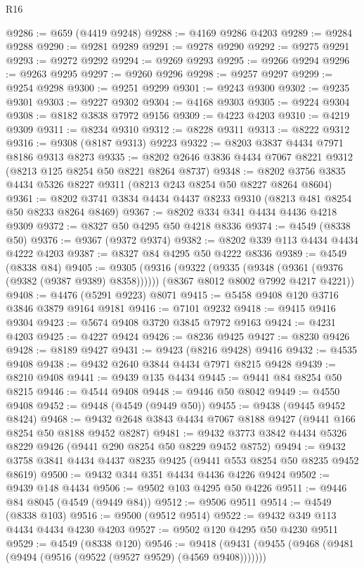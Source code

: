 \begin{lexlean}{R16}
\begin{coremodule}
@9286 := @659 (@4419 @9248)
@9288 := @4169 @9286 @4203
@9289 := @9284 @9288
@9290 := @9281 @9289
@9291 := @9278 @9290
@9292 := @9275 @9291
@9293 := @9272 @9292
@9294 := @9269 @9293
@9295 := @9266 @9294
@9296 := @9263 @9295
@9297 := @9260 @9296
@9298 := @9257 @9297
@9299 := @9254 @9298
@9300 := @9251 @9299
@9301 := @9243 @9300
@9302 := @9235 @9301
@9303 := @9227 @9302
@9304 := @4168 @9303
@9305 := @9224 @9304
@9308 := @8182 @3838 @7972 @9156
@9309 := @4223 @4203
@9310 := @4219 @9309
@9311 := @8234 @9310
@9312 := @8228 @9311
@9313 := @8222 @9312
@9316 := @9308 (@8187 @9313) @9223
@9322 := @8203 @3837 @4434 @7971 @8186 @9313 @8273
@9335 := @8202 @2646 @3836 @4434 @7067 @8221 @9312 (@8213 @125 @8254 @50 @8221 @8264 @8737)
@9348 := @8202 @3756 @3835 @4434 @5326 @8227 @9311 (@8213 @243 @8254 @50 @8227 @8264 @8604)
@9361 := @8202 @3741 @3834 @4434 @4437 @8233 @9310 (@8213 @481 @8254 @50 @8233 @8264 @8469)
@9367 := @8202 @334 @341 @4434 @4436 @4218 @9309
@9372 := @8327 @50 @4295 @50 @4218 @8336
@9374 := @4549 (@8338 @50)
@9376 := @9367 (@9372 @9374)
@9382 := @8202 @339 @113 @4434 @4434 @4222 @4203
@9387 := @8327 @84 @4295 @50 @4222 @8336
@9389 := @4549 (@8338 @84)
@9405 := @9305
    (@9316
      (@9322 (@9335 (@9348 (@9361 (@9376 (@9382 (@9387 @9389) @8358))))))
      (@8367 @8012 @8002 @7992 @4217 @4221))
@9408 := @4476 (@5291 @9223) @8071
@9415 := @5458 @9408 @120 @3716 @3846 @3879 @9164 @9181
@9416 := @7101 @9232
@9418 := @9415 @9416 @9304
@9423 := @5674 @9408 @3720 @3845 @7972 @9163
@9424 := @4231 @4203
@9425 := @4227 @9424
@9426 := @8236 @9425
@9427 := @8230 @9426
@9428 := @8189 @9427
@9431 := @9423 (@8216 @9428) @9416
@9432 := @4535 @9408
@9438 := @9432 @2640 @3844 @4434 @7971 @8215 @9428
@9439 := @8210 @9408
@9441 := @9439 @135 @4434
@9445 := @9441 @84 @8254 @50 @8215
@9446 := @4544 @9408
@9448 := @9446 @50 @8042
@9449 := @4550 @9408
@9452 := @9448 (@4549 (@9449 @50))
@9455 := @9438 (@9445 @9452 @8424)
@9468 := @9432 @2648 @3843 @4434 @7067 @8188 @9427 (@9441 @166 @8254 @50 @8188 @9452 @8287)
@9481 := @9432 @3773 @3842 @4434 @5326 @8229 @9426 (@9441 @290 @8254 @50 @8229 @9452 @8752)
@9494 := @9432 @3758 @3841 @4434 @4437 @8235 @9425 (@9441 @553 @8254 @50 @8235 @9452 @8619)
@9500 := @9432 @344 @351 @4434 @4436 @4226 @9424
@9502 := @9439 @148 @4434
@9506 := @9502 @103 @4295 @50 @4226
@9511 := @9446 @84 @8045 (@4549 (@9449 @84))
@9512 := @9506 @9511
@9514 := @4549 (@8338 @103)
@9516 := @9500 (@9512 @9514)
@9522 := @9432 @349 @113 @4434 @4434 @4230 @4203
@9527 := @9502 @120 @4295 @50 @4230 @9511
@9529 := @4549 (@8338 @120)
@9546 := @9418
    (@9431
      (@9455 (@9468 (@9481 (@9494 (@9516 (@9522 (@9527 @9529) (@4569 @9408)))))))

\end{coremodule}
\end{lexlean}
